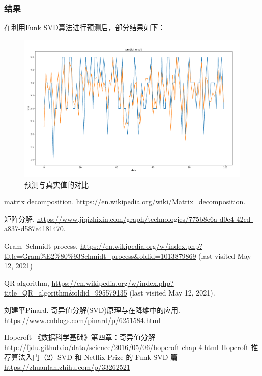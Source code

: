 \documentclass{ctexrep}
\begin{document}
\subsubsection{结果}
在利用Funk SVD算法进行预测后，部分结果如下：
     \begin{figure}[ht]
        \centering
    	\includegraphics[width=\textwidth]{figures/recommend.png}
    	\caption{预测与真实值的对比}
    	\label{fig:Funk_SVD}
    \end{figure}


\cleardoublepage{}
{}
\renewcommand{\baselinestretch}{1.6}
\begin{thebibliography}{00}

   matrix decomposition.  \url{https://en.wikipedia.org/wiki/Matrix_decomposition}.
  
   矩阵分解.  \url{https://www.jiqizhixin.com/graph/technologies/775b8e6a-d0e4-42cd-a837-d587e4181470}.
  
   Gram–Schmidt process, \url{https://en.wikipedia.org/w/index.php?title=Gram%E2%80%93Schmidt_process&oldid=1013879869} (last visited May 12, 2021)

     QR algorithm, \url{https://en.wikipedia.org/w/index.php?title=QR_algorithm&oldid=995579135} (last visited May 12, 2021).
  
   刘建平Pinard. 奇异值分解(SVD)原理与在降维中的应用. \url{https://www.cnblogs.com/pinard/p/6251584.html}
  
  Hopcroft 《数据科学基础》第四章：奇异值分解\url{http://fjdu.github.io/data/science/2016/05/06/hopcroft-chap-4.html}
    Hopcroft 推荐算法入门（2）SVD 和 Netflix Prize 的 Funk-SVD 篇\url{https://zhuanlan.zhihu.com/p/33262521}
  

\end{thebibliography}

\cleardoublepage
\end{document}
